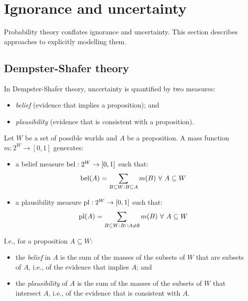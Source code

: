 \section{Ignorance and uncertainty}

Probability theory conflates ignorance and uncertainty.
This section describes approaches to explicitly modelling them.

\subsection{Dempster-Shafer theory}

In Dempster-Shafer theory, uncertainty is quantified by two measures:

\begin{itemize}
  \item \textit{belief} (evidence that implies a proposition); and
  \item \textit{plausibility} (evidence that is consistent with a proposition).
\end{itemize}

\begin{dfn}
  \label{def:4:BeliefPlausibility}
  Let $W$ be a set of possible worlds and $A$ be a proposition.
  A mass function $m : 2^W \rightarrow [0, 1]$ generates:
  \begin{itemize}
    \item a belief measure $\operatorname*{bel} : 2^W \rightarrow [0, 1]$ such that:
          \begin{equation}
            \label{eqn:4:Belief}
            \operatorname*{bel}(A) =
            \sum_{B \subseteq W : B \subseteq A} m(B)
            \ \forall\
            A \subseteq W
          \end{equation}
    \item a plausibility measure $\operatorname*{pl} : 2^W \rightarrow [0, 1]$ such that:
          \begin{equation}
            \label{eqn:4:Plausibility}
            \operatorname*{pl}(A) =
            \sum_{B \subseteq W : B \cap A \neq \emptyset} m(B)
            \ \forall\
            A \subseteq W
          \end{equation}
  \end{itemize}
\end{dfn}

I.e., for a proposition $A \subseteq W$:

\begin{itemize}
  \item the \textit{belief} in $A$ is the sum of the masses of the subsets of
        $W$ that are subsets of $A$, i.e., of the evidence that implies $A$; and
  \item the \textit{plausibility} of $A$ is the sum of the masses of the subsets
        of $W$ that intersect $A$, i.e., of the evidence that is consistent with
        $A$.
\end{itemize}

